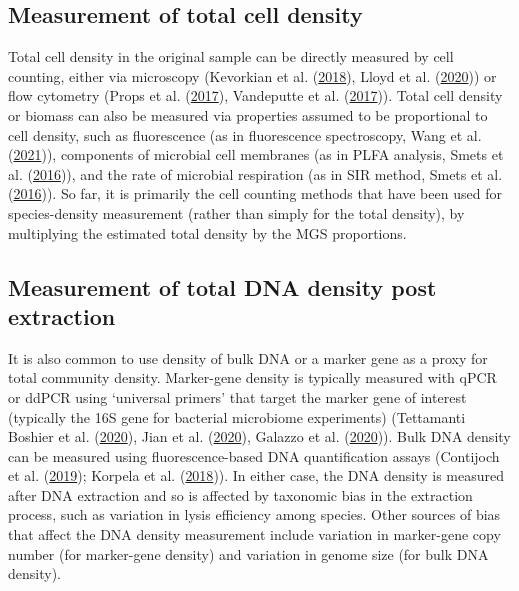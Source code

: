 \documentclass[
]{article}
\begin{document}
\hypertarget{measurement-of-total-cell-density}{%
\subsection{Measurement of total cell density}\label{measurement-of-total-cell-density}}

Total cell density in the original sample can be directly measured by cell counting, either via microscopy (Kevorkian et al. (\protect\hyperlink{ref-kevorkian2018esti}{2018}), Lloyd et al. (\protect\hyperlink{ref-lloyd2020evid}{2020})) or flow cytometry (Props et al. (\protect\hyperlink{ref-props2017abso}{2017}), Vandeputte et al. (\protect\hyperlink{ref-vandeputte2017quan}{2017})).
Total cell density or biomass can also be measured via properties assumed to be proportional to cell density, such as fluorescence (as in fluorescence spectroscopy, Wang et al. (\protect\hyperlink{ref-wang2021curr}{2021})), components of microbial cell membranes (as in PLFA analysis, Smets et al. (\protect\hyperlink{ref-smets2016amet}{2016})), and the rate of microbial respiration (as in SIR method, Smets et al. (\protect\hyperlink{ref-smets2016amet}{2016})).
So far, it is primarily the cell counting methods that have been used for species-density measurement (rather than simply for the total density), by multiplying the estimated total density by the MGS proportions.

\hypertarget{measurement-of-total-dna-density-post-extraction}{%
\subsection{Measurement of total DNA density post extraction}\label{measurement-of-total-dna-density-post-extraction}}

It is also common to use density of bulk DNA or a marker gene as a proxy for total community density.
Marker-gene density is typically measured with qPCR or ddPCR using `universal primers' that target the marker gene of interest (typically the 16S gene for bacterial microbiome experiments) (Tettamanti Boshier et al. (\protect\hyperlink{ref-tettamantiboshier2020comp}{2020}), Jian et al. (\protect\hyperlink{ref-jian2020quan}{2020}), Galazzo et al. (\protect\hyperlink{ref-galazzo2020howt}{2020})).
Bulk DNA density can be measured using fluorescence-based DNA quantification assays (Contijoch et al. (\protect\hyperlink{ref-contijoch2019gutm}{2019}); Korpela et al. (\protect\hyperlink{ref-korpela2018inte}{2018})).
In either case, the DNA density is measured after DNA extraction and so is affected by taxonomic bias in the extraction process, such as variation in lysis efficiency among species.
Other sources of bias that affect the DNA density measurement include variation in marker-gene copy number (for marker-gene density) and variation in genome size (for bulk DNA density).
\end{document}
